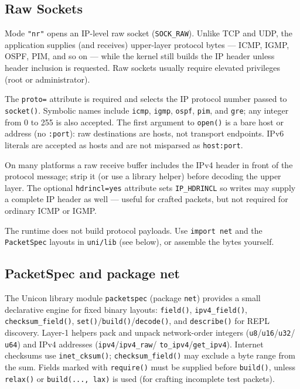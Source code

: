 \subsection*{Raw Sockets}
Mode \texttt{"nr"} opens an IP-level raw socket
(\texttt{SOCK\_RAW}). Unlike TCP and UDP, the application supplies
(and receives) upper-layer protocol bytes --- ICMP, IGMP, OSPF, PIM,
and so on --- while the kernel still builds the IP header unless
header inclusion is requested. Raw sockets usually require elevated
privileges (root or administrator).

The \texttt{proto=} attribute is required and selects the IP protocol
number passed to \texttt{socket()}. Symbolic names include
\texttt{icmp}, \texttt{igmp}, \texttt{ospf}, \texttt{pim}, and
\texttt{gre}; any integer from 0 to 255 is also accepted. The first
argument to \texttt{open()} is a bare host or address (no
\texttt{:port}): raw destinations are hosts, not transport endpoints.
IPv6 literals are accepted as hosts and are not misparsed as
\texttt{host:port}.


On many platforms a raw receive buffer includes the IPv4 header in
front of the protocol message; strip it (or use a library helper)
before decoding the upper layer. The optional \texttt{hdrincl=yes}
attribute sets \texttt{IP\_HDRINCL} so writes may supply a complete
IP header as well --- useful for crafted packets, but not required
for ordinary ICMP or IGMP.

The runtime does not build protocol payloads. Use
\texttt{import~net} and the \texttt{PacketSpec} layouts in
\texttt{uni/lib} (see below), or assemble the bytes yourself.

\subsection*{PacketSpec and package net}
The Unicon library module \texttt{packetspec} (package \texttt{net})
provides a small declarative engine for fixed binary layouts:
\texttt{field()}, \texttt{ipv4\_field()}, \texttt{checksum\_field()},
\texttt{set()}/\texttt{build()}/\texttt{decode()}, and
\texttt{describe()} for REPL discovery. Layer-1 helpers pack and
unpack network-order integers (\texttt{u8}/\texttt{u16}/\texttt{u32}/
\texttt{u64}) and IPv4 addresses (\texttt{ipv4}/\texttt{ipv4\_raw}/
\texttt{to\_ipv4}/\texttt{get\_ipv4}). Internet checksums use
\texttt{inet\_cksum()}; \texttt{checksum\_field()} may exclude a
byte range from the sum. Fields marked with \texttt{require()}
must be supplied before \texttt{build()}, unless
\texttt{relax()} or \texttt{build(..., lax)} is used (for
crafting incomplete test packets).

